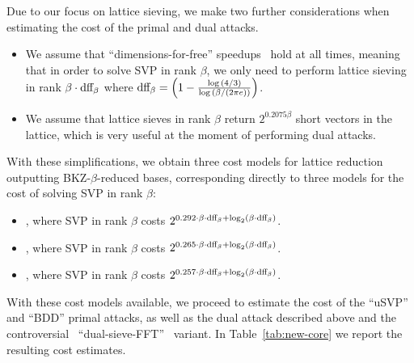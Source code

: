 Due to our focus on lattice sieving, we make two further considerations when estimating the cost of the primal and dual attacks.
\begin{itemize}
	\item We assume that ``dimensions-for-free'' speedups~\cite{EC:Ducas18} hold at all times, meaning that in order to solve SVP in rank $\beta$, we only need to perform lattice sieving in rank $\beta \cdot \text{dff}_\beta$ where $\text{dff}_\beta = \left(1 - \frac{\log{(4/3)}}{\log{(\beta / (2 \pi e))}}\right)$.
	\item We assume that lattice sieves in rank $\beta$ return $2^{0.2075 \beta}$ short vectors in the lattice, which is very useful at the moment of performing dual attacks.
\end{itemize}

With these simplifications, we obtain three cost models for lattice reduction outputting BKZ-$\beta$-reduced bases, corresponding directly to three models for the cost of solving SVP in rank $\beta$:
\begin{itemize}
	\item \clsfsieve, where SVP in rank $\beta$ costs $2^{0.292 \cdot \beta \cdot \text{dff}_\beta + \log_2(\beta \cdot \text{dff}_\beta)}$.
	\item \qgroversieve, where SVP in rank $\beta$ costs $2^{0.265 \cdot \beta \cdot \text{dff}_\beta + \log_2(\beta \cdot \text{dff}_\beta)}$.
	\item \qrandwalksieve, where SVP in rank $\beta$ costs $2^{0.257 \cdot \beta \cdot \text{dff}_\beta + \log_2(\beta \cdot \text{dff}_\beta)}$.
\end{itemize}

With these cost models available, we proceed to estimate the cost of the ``uSVP'' and ``BDD'' primal attacks, as well as the dual attack described above and the controversial~\cite{C:DucPul23,EC:PouShe24,cryptoeprint:2023/1850} ``dual-sieve-FFT''~\cite{AC:GuoJoh21,MATZOV22} variant. In Table~\ref{tab:new-core} we report the resulting cost estimates.

